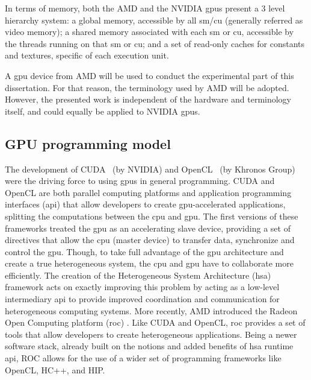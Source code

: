 In terms of memory, both the AMD and the NVIDIA \acrshort{gpu}s present a 3 level hierarchy system: a global memory, accessible by all \acrshort{sm}/\acrshort{cu} (generally referred as video memory); a shared memory associated with each \acrshort{sm} or \acrshort{cu}, accessible by the threads running on that \acrshort{sm} or \acrshort{cu}; and a set of read-only caches for constants and textures, specific of each execution unit.

A \acrshort{gpu} device from AMD will be used to conduct the experimental part of this dissertation. For that reason, the terminology used by AMD will be adopted. However, the presented work is independent of the hardware and terminology itself, and could equally be applied to NVIDIA \acrshort{gpu}s.

\subsection{GPU programming model}

The development of CUDA~\cite{nvidia_cuda_2017} (by NVIDIA) and OpenCL~\cite{noauthor_opencl_2013} (by Khronos Group) were the driving force to using \acrshort{gpu}s in general programming. CUDA and OpenCL are both parallel computing platforms and application programming interfaces (\acrshort{api}) that allow developers to create \acrshort{gpu}-accelerated applications, splitting the computations between the \acrshort{cpu} and \acrshort{gpu}. The first versions of these frameworks treated the \acrshort{gpu} as an accelerating slave device, providing a set of directives that allow the \acrshort{cpu} (master device) to transfer data, synchronize and control the \acrshort{gpu}.  Though, to take full advantage of the \acrshort{gpu} architecture and create a true heterogeneous system, the \acrshort{cpu} and \acrshort{gpu} have to collaborate more efficiently. The creation of the Heterogeneous System Architecture (\acrshort{hsa}) \cite{hwu_heterogeneous_2015} framework acts on exactly improving this problem by acting as a low-level intermediary \acrshort{api} to provide improved coordination and communication for heterogeneous computing systems.  More recently, AMD introduced the Radeon Open Computing platform (\acrshort{roc}) \cite{noauthor_radeonopencompute/rocm_2019}. Like CUDA and OpenCL, \acrshort{roc} provides a set of tools that allow developers to create heterogeneous applications. Being a newer software stack, already built on the notions and added benefits of \acrshort{hsa} runtime \acrshort{api}, ROC allows for the use of a wider set of programming frameworks like OpenCL, HC++, and HIP.

